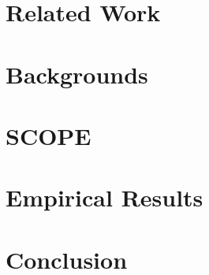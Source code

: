 \documentclass{article} %
\begin{document}
\section{Related Work}


\section{Backgrounds}
\label{sec:background}


\section{SCOPE}
\label{sec:method}



\section{Empirical Results}
\label{sec:emp}



\section{Conclusion}




\newpage    






\appendix
\newpage    

\end{document}
